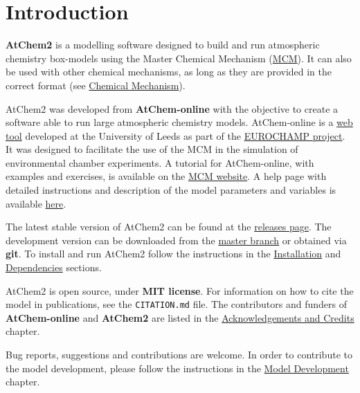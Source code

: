 %
%
%
%

\chapter{Introduction} \label{ch:introduction}

\textbf{AtChem2} is a modelling software designed to build and run
atmospheric chemistry box-models using the Master Chemical Mechanism
(\href{http://mcm.leeds.ac.uk/MCM/}{MCM}). It can also be used with
other chemical mechanisms, as long as they are provided in the correct
format (see \hyperref[sec:chemical-mechanism]{Chemical Mechanism}).

AtChem2 was developed from \textbf{AtChem-online} with the objective
to create a software able to run large atmospheric chemistry
models. AtChem-online is a
\href{https://atchem.leeds.ac.uk/webapp/}{web tool} developed at the
University of Leeds as part of the
\href{https://www.eurochamp.org/}{EUROCHAMP project}. It was designed
to facilitate the use of the MCM in the simulation of environmental
chamber experiments. A tutorial for AtChem-online, with examples and
exercises, is available on the
\href{http://mcm.leeds.ac.uk/MCMv3.3.1/atchem/tutorial_intro.htt}{MCM
  website}. A help page with detailed instructions and description of
the model parameters and variables is available
\href{https://atchem.leeds.ac.uk/webapp/run/help.html}{here}.

The latest stable version of AtChem2 can be found at the
\href{https://github.com/AtChem/AtChem2/releases}{releases page}. The
development version can be downloaded from the
\href{https://github.com/AtChem/AtChem2/archive/master.zip}{master
  branch} or obtained via \textbf{git}. To install and run AtChem2
follow the instructions in the \hyperref[sec:install]{Installation}
and \hyperref[sec:dependencies]{Dependencies} sections.

AtChem2 is open source, under \textbf{MIT license}. For information on
how to cite the model in publications, see the \verb|CITATION.md|
file. The contributors and funders of \textbf{AtChem-online} and
\textbf{AtChem2} are listed in the
\hyperref[ch:credits]{Acknowledgements and Credits} chapter.

Bug reports, suggestions and contributions are welcome. In order to
contribute to the model development, please follow the instructions in
the \hyperref[ch:development]{Model Development} chapter.
